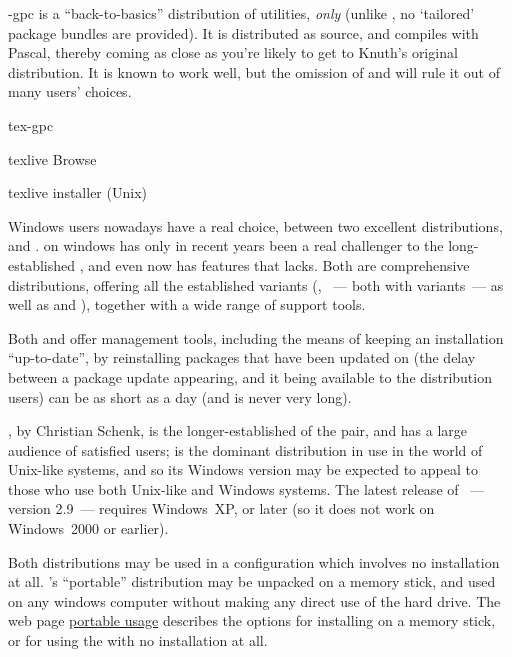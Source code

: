 \tex{}-gpc is a ``back-to-basics'' distribution of \tex{} utilities,
\emph{only} (unlike \texlive{}, no `tailored' package bundles are
provided).  It is distributed as source, and compiles with 
Pascal, thereby coming as close as you're likely to get to Knuth's original
distribution.  It is known to work well, but the omission of \etex{}
and \pdftex{} will rule it out of many users' choices.
\begin{ctanrefs}
\item[tex-gpc]
\item[texlive]Browse 
\item[texlive installer (Unix)]
\end{ctanrefs}


Windows users nowadays have a real choice, between two excellent
distributions, \miktex{} and \texlive{}.  \texlive{} on windows has
only in recent years been a real challenger to the long-established
\miktex{}, and even now \miktex{} has features that \texlive{} lacks.
Both are comprehensive
distributions, offering all the established \tex{} variants (\tex{},
\pdftex{}~--- both with \etex{} variants~--- as well as \xetex{} and
\luatex{}), together with a wide range of support tools.
  
Both \miktex{} and \texlive{} offer management tools, including the
means of keeping an installation ``up-to-date'', by reinstalling
packages that have been updated on  (the delay between a
package update appearing, and it being available to the distribution
users) can be as short as a day (and is never very long).

\miktex{}, by Christian Schenk, is the longer-established of the pair,
and has a large audience of satisfied users; \texlive{} is the
dominant distribution in use in the world of Unix-like systems, and so
its Windows version may be expected to appeal to those who use both
Unix-like and Windows systems.  The latest release of \miktex{}~---
version 2.9~--- requires Windows~XP, or later (so it does not work on
Windows~2000 or earlier).

Both distributions may be used in a configuration which involves no
installation at all.  \miktex{}'s ``portable'' distribution may be
unpacked on a memory stick, and used on any windows computer without
making any direct use of the hard drive.  The web page %
\href{http://www.tug.org/texlive/portable.html}{\texlive{} portable usage}
describes the options for installing \texlive{} on a memory stick, or
for using the \texlive{}  with no installation at all.
  
